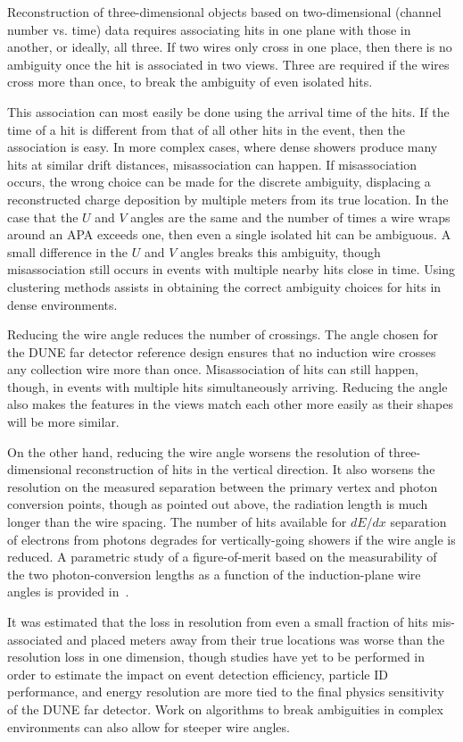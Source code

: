 Reconstruction of three-dimensional objects based on two-dimensional (channel number vs. time)
data requires associating hits in one plane with those in another, or ideally, all three.
If two wires only cross in one place, then there is no ambiguity once the hit is associated
in two views.  Three are required if the wires cross more than once, to break the ambiguity
of even isolated hits.

This association can most easily be done using the arrival time of the hits.  If the time of
a hit is different from that of all other hits in the event, then the association is easy.
In more complex cases, where dense showers produce many hits at similar drift distances,
misassociation can happen.  If misassociation occurs, the wrong choice can be made for
the discrete ambiguity, displacing a reconstructed charge deposition
by multiple meters from its true location.  In the case that the $U$ and $V$ angles are the
same and the number of times a wire wraps around an APA exceeds one, then even a single isolated
hit can be ambiguous.  A small difference in the $U$ and $V$ angles breaks this ambiguity,
though misassociation still occurs in events with multiple nearby hits close in time.
Using clustering methods assists in obtaining the correct ambiguity choices for hits in
dense environments.

Reducing the wire angle reduces the number of crossings.  The angle chosen for the DUNE
far detector reference design ensures that no induction wire crosses any collection wire
more than once.  Misassociation of hits can still happen, though, in events with multiple
hits simultaneously arriving.  Reducing the angle also makes the features in the views
match each other more easily as their shapes will be more similar.

On the other hand, reducing the wire angle worsens the resolution of three-dimensional
reconstruction of hits in the vertical direction.  It also worsens the resolution on the
measured separation between the primary vertex and photon conversion points, though as pointed
out above, the radiation length is much longer than the wire spacing.  The number of hits
available for $dE/dx$ separation of electrons from photons degrades for vertically-going
showers if the wire angle is reduced.  
A parametric study of a figure-of-merit based on the measurability of the two photon-conversion
lengths as a function of the induction-plane wire angles is provided in~\cite{wire-orientation}.

It was estimated that the loss in resolution from even a small fraction
of hits mis-associated and placed meters away from their true
locations was worse than the resolution loss in one
dimension\cite{docdb-8981}, though studies have yet to be performed
in order to estimate the impact on event detection efficiency,
particle ID performance, and energy resolution are more tied to the
final physics sensitivity of the DUNE far detector.  Work on
algorithms to break ambiguities in complex environments can also allow
for steeper wire angles.

